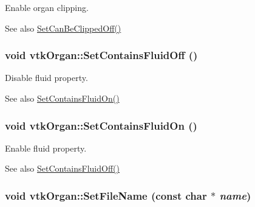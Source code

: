 Enable organ clipping. 

\begin{DoxySeeAlso}{See also}
\hyperlink{classvtkOrgan_a6faee69d6495879b5f545bf1446dd304}{SetCanBeClippedOff()} 
\end{DoxySeeAlso}
\hypertarget{classvtkOrgan_a387870655644666d7e337071ebca3708}{
\subsubsection[{SetContainsFluidOff}]{\setlength{\rightskip}{0pt plus 5cm}void vtkOrgan::SetContainsFluidOff ()}}
\label{classvtkOrgan_a387870655644666d7e337071ebca3708}


Disable fluid property. 

\begin{DoxySeeAlso}{See also}
\hyperlink{classvtkOrgan_a776239497bc5ca06cdea73d5dd572000}{SetContainsFluidOn()} 
\end{DoxySeeAlso}
\hypertarget{classvtkOrgan_a776239497bc5ca06cdea73d5dd572000}{
\subsubsection[{SetContainsFluidOn}]{\setlength{\rightskip}{0pt plus 5cm}void vtkOrgan::SetContainsFluidOn ()}}
\label{classvtkOrgan_a776239497bc5ca06cdea73d5dd572000}


Enable fluid property. 

\begin{DoxySeeAlso}{See also}
\hyperlink{classvtkOrgan_a387870655644666d7e337071ebca3708}{SetContainsFluidOff()} 
\end{DoxySeeAlso}
\hypertarget{classvtkOrgan_a9fad20fc19aadd62505ed6a39e482d23}{
\subsubsection[{SetFileName}]{\setlength{\rightskip}{0pt plus 5cm}void vtkOrgan::SetFileName (const char $\ast$ {\em name})}}
\label{classvtkOrgan_a9fad20fc19aadd62505ed6a39e482d23}


